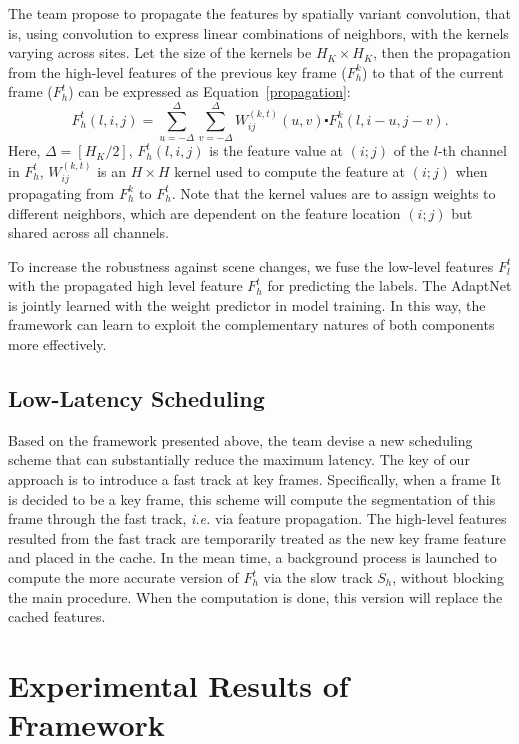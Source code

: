 \documentclass[10pt,twocolumn,letterpaper]{article}
\begin{document}
The team propose to propagate the features by spatially variant convolution, that is, using convolution to express linear combinations of neighbors, with the kernels varying across sites. Let the size of the kernels be $H_K\times H_K$, then the propagation from the high-level features of the previous key frame ($F_h^k$) to that of the current frame ($F_h^t$) can be expressed as Equation~\ref{propagation}:
\begin{equation}
F_h^t(l,i,j)=\sum_{u=-\Delta}^{\Delta}\sum_{v=-\Delta}^{\Delta}W_{ij}^{(k,t)}(u,v)\centerdot F_h^k(l,i-u,j-v).     \label{propagation}
\end{equation}
Here, $\Delta=[H_K/2]$, $F_h^t(l,i,j)$ is the feature value at $(i;j)$ of the $l$-th channel in $F_h^t$, $W_{ij}^{(k,t)}$ is an $H\times H$ kernel used to compute the feature at $(i;j)$ when propagating from $F_h^k$ to $F_h^t$. Note that the kernel values are to assign weights to different neighbors, which are dependent on the feature location $(i;j)$ but shared across all channels.

To increase the robustness against scene changes, we fuse the low-level features $F_l^t$ with the propagated high level feature $F_h^t$ for predicting the labels. The AdaptNet is jointly learned with the weight predictor in model training. In this way, the framework can learn to exploit the complementary natures of both components more effectively.

\subsection{Low-Latency Scheduling}

Based on the framework presented above, the team devise a new scheduling scheme that can substantially reduce the maximum latency. The key of our approach is to introduce a fast track at key frames. Specifically, when a frame It is decided to be a key frame, this scheme will compute the segmentation of this frame through the fast track, \emph{i.e.} via feature propagation. The high-level features resulted from the fast track are temporarily treated as the new key frame feature and placed in the cache. In the mean time, a background process is launched to compute the more accurate version of $F_h^t$ via the slow track $S_h$, without blocking the main procedure. When the computation is done, this version will replace the cached features.

\section{Experimental Results of Framework}
\end{document}

